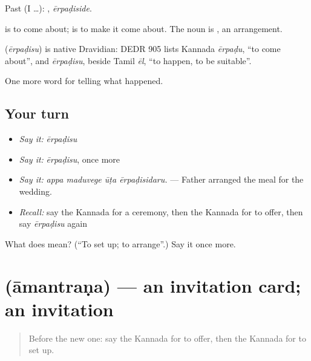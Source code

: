 Past (I …): , \emph{ērpaḍiside}.

 is to come about;  is to make it come about. The noun is , an arrangement.

\begin{cousinweb}
\textbf{} (\emph{ērpaḍisu}) is native Dravidian: DEDR 905 lists Kannada \emph{ērpaḍu}, \textquotedblleft{}to come about\textquotedblright{}, and \emph{ērpaḍisu}, beside Tamil \emph{ēl}, \textquotedblleft{}to happen, to be suitable\textquotedblright{}.
\end{cousinweb}

\begin{grammarlens}[title={What you've built}]
One more word for telling what happened.
\end{grammarlens}

\subsection*{Your turn}
\begin{itemize}
\raggedright
  \item \emph{Say it:} \emph{ērpaḍisu}
  \item \emph{Say it:} \emph{ērpaḍisu}, once more
  \item \emph{Say it:} \emph{appa maduvege ūṭa ērpaḍisidaru.} — Father arranged the meal for the wedding.
  \item \emph{Recall:} say the Kannada for a ceremony, then the Kannada for to offer, then say \emph{ērpaḍisu} again
\end{itemize}

\begin{tcolorbox}[breakable,colback=teal!4,colframe=teal!35!black,title={Before you move on}]
What does  mean? (\textquotedblleft{}To set up; to arrange\textquotedblright{}.) Say it once more.
\end{tcolorbox}
\section[\texorpdfstring{\kn{ಆಮಂತ್ರಣ} (āmantraṇa)}{ಆಮಂತ್ರಣ (āmantraṇa)}]{ (āmantraṇa) — an invitation card; an invitation}

\label{lesson:KA-C333-amantrana}



\begin{quote}
Before the new one: say the Kannada for to offer, then the Kannada for to set up.
\end{quote}


